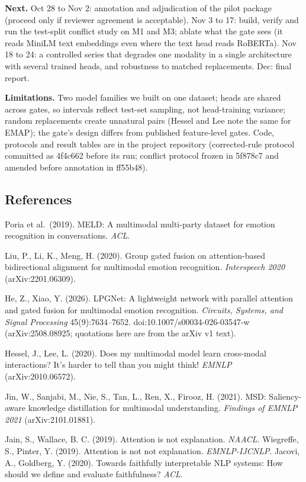 \documentclass[
  10pt,
]{article}
\begin{document}
\textbf{Next.} Oct 28 to Nov 2: annotation and adjudication of the pilot
package (proceed only if reviewer agreement is acceptable). Nov 3 to 17:
build, verify and run the test-split conflict study on M1 and M3; ablate
what the gate sees (it reads MiniLM text embeddings even where the text
head reads RoBERTa). Nov 18 to 24: a controlled series that degrades one
modality in a single architecture with several trained heads, and
robustness to matched replacements. Dec: final report.

\textbf{Limitations.} Two model families we built on one dataset; heads
are shared across gates, so intervals reflect test-set sampling, not
head-training variance; random replacements create unnatural pairs
(Hessel and Lee note the same for EMAP); the gate's design differs from
published feature-level gates. Code, protocols and result tables are in
the project repository (corrected-rule protocol committed as 4f4c662
before its run; conflict protocol frozen in 5f878c7 and amended before
annotation in ff55b48).

\subsection{References}\label{references}

\footnotesize

Poria et al.~(2019). MELD: A multimodal multi-party dataset for emotion
recognition in conversations. \emph{ACL}.

Liu, P., Li, K., Meng, H. (2020). Group gated fusion on attention-based
bidirectional alignment for multimodal emotion recognition.
\emph{Interspeech 2020} (arXiv:2201.06309).

He, Z., Xiao, Y. (2026). LPGNet: A lightweight network with parallel
attention and gated fusion for multimodal emotion recognition.
\emph{Circuits, Systems, and Signal Processing} 45(9):7634--7652.
doi:10.1007/s00034-026-03547-w (arXiv:2508.08925; quotations here are
from the arXiv v1 text).

Hessel, J., Lee, L. (2020). Does my multimodal model learn cross-modal
interactions? It's harder to tell than you might think! \emph{EMNLP}
(arXiv:2010.06572).

Jin, W., Sanjabi, M., Nie, S., Tan, L., Ren, X., Firooz, H. (2021). MSD:
Saliency-aware knowledge distillation for multimodal understanding.
\emph{Findings of EMNLP 2021} (arXiv:2101.01881).

Jain, S., Wallace, B. C. (2019). Attention is not explanation.
\emph{NAACL}. Wiegreffe, S., Pinter, Y. (2019). Attention is not not
explanation. \emph{EMNLP-IJCNLP}. Jacovi, A., Goldberg, Y. (2020).
Towards faithfully interpretable NLP systems: How should we define and
evaluate faithfulness? \emph{ACL}.
\end{document}
